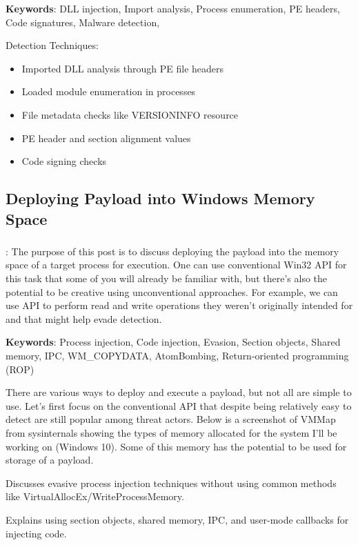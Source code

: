 \documentclass{article}
\begin{document}
\textbf{Keywords}: DLL injection, Import analysis, Process enumeration, PE headers, Code signatures, Malware detection,


Detection Techniques:

\begin{itemize}
\item Imported DLL analysis through PE file headers
\item Loaded module enumeration in processes
\item File metadata checks like VERSIONINFO resource
\item PE header and section alignment values
\item Code signing checks
\end{itemize}

  
\subsection{Deploying Payload into Windows Memory Space}

\subsubsection{\textcite{Zhan:2018}}
\textbf{}:  The purpose of this post is to discuss deploying the payload into the memory space of a target process for execution. One can use conventional Win32 API for this task that some of you will already be familiar with, but there’s also the potential to be creative using unconventional approaches. For example, we can use API to perform read and write operations they weren’t originally intended for and that might help evade detection.

\textbf{Keywords}: Process injection, Code injection, Evasion, Section objects, Shared memory, IPC, WM\_COPYDATA, AtomBombing, Return-oriented programming (ROP)

There are various ways to deploy and execute a payload, but not all are simple to use. Let’s first focus on the conventional API that despite being relatively easy to detect are still popular among threat actors.
Below is a screenshot of VMMap from sysinternals showing the types of memory allocated for the system I’ll be working on (Windows 10). Some of this memory has the potential to be used for storage of a payload.

Discusses evasive process injection techniques without using common methods like VirtualAllocEx/WriteProcessMemory.

Explains using section objects, shared memory, IPC, and user-mode callbacks for injecting code.
\end{document}
